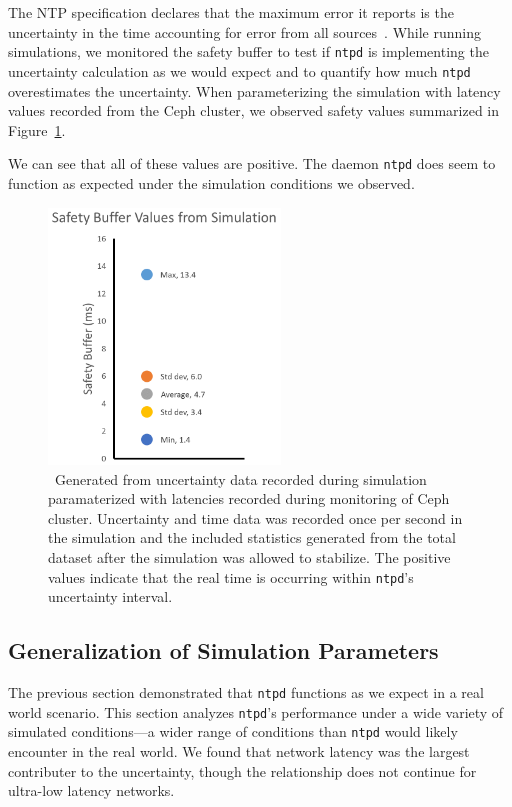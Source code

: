 The NTP specification declares that the maximum error it reports is
the uncertainty in the time accounting for error from all
sources~\citep{Burbank2010}.  While running simulations, we monitored
the safety buffer to test if \texttt{ntpd} is implementing the
uncertainty calculation as we would expect and to quantify how much
\texttt{ntpd} overestimates the uncertainty.  When parameterizing the
simulation with latency values recorded from the Ceph cluster, we
observed safety values summarized in Figure~\ref{fig:safety-data}.

We can see that all of these values are positive. The daemon
\texttt{ntpd} does seem to function as expected under the simulation
conditions we observed.

\begin{figure}[!htbp]
  \centering
  \caption{~Generated from uncertainty data recorded during simulation paramaterized
  with latencies recorded during monitoring of Ceph cluster. Uncertainty and time
  data was recorded once per second in the simulation and the included statistics 
  generated from the total dataset after the simulation was allowed to stabilize. 
  The positive values indicate that the real time is occurring within \texttt{ntpd}'s 
  uncertainty interval.}
  \label{fig:safety-data}
  \includegraphics[width=0.55\textwidth]{5pointsSafety.png}
\end{figure}

\subsection{Generalization of Simulation Parameters}

The previous section demonstrated that \texttt{ntpd} functions as we expect in 
a real world scenario.  This section
analyzes \texttt{ntpd}'s performance under a wide variety of simulated
conditions---a wider range of conditions than \texttt{ntpd} would
likely encounter in the real world.  We found that network latency was the 
largest contributer to the uncertainty, though the relationship does not 
continue for ultra-low latency networks.

